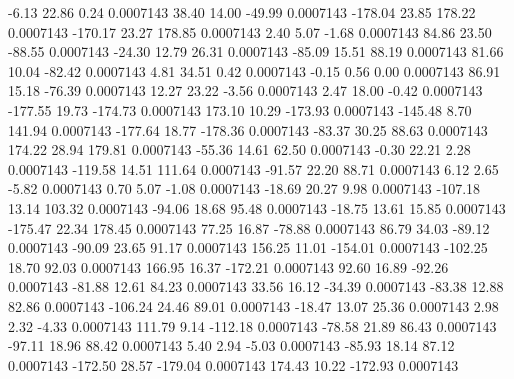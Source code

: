        -6.13       22.86        0.24     0.0007143
       38.40       14.00      -49.99     0.0007143
     -178.04       23.85      178.22     0.0007143
     -170.17       23.27      178.85     0.0007143
        2.40        5.07       -1.68     0.0007143
       84.86       23.50      -88.55     0.0007143
      -24.30       12.79       26.31     0.0007143
      -85.09       15.51       88.19     0.0007143
       81.66       10.04      -82.42     0.0007143
        4.81       34.51        0.42     0.0007143
       -0.15        0.56        0.00     0.0007143
       86.91       15.18      -76.39     0.0007143
       12.27       23.22       -3.56     0.0007143
        2.47       18.00       -0.42     0.0007143
     -177.55       19.73     -174.73     0.0007143
      173.10       10.29     -173.93     0.0007143
     -145.48        8.70      141.94     0.0007143
     -177.64       18.77     -178.36     0.0007143
      -83.37       30.25       88.63     0.0007143
      174.22       28.94      179.81     0.0007143
      -55.36       14.61       62.50     0.0007143
       -0.30       22.21        2.28     0.0007143
     -119.58       14.51      111.64     0.0007143
      -91.57       22.20       88.71     0.0007143
        6.12        2.65       -5.82     0.0007143
        0.70        5.07       -1.08     0.0007143
      -18.69       20.27        9.98     0.0007143
     -107.18       13.14      103.32     0.0007143
      -94.06       18.68       95.48     0.0007143
      -18.75       13.61       15.85     0.0007143
     -175.47       22.34      178.45     0.0007143
       77.25       16.87      -78.88     0.0007143
       86.79       34.03      -89.12     0.0007143
      -90.09       23.65       91.17     0.0007143
      156.25       11.01     -154.01     0.0007143
     -102.25       18.70       92.03     0.0007143
      166.95       16.37     -172.21     0.0007143
       92.60       16.89      -92.26     0.0007143
      -81.88       12.61       84.23     0.0007143
       33.56       16.12      -34.39     0.0007143
      -83.38       12.88       82.86     0.0007143
     -106.24       24.46       89.01     0.0007143
      -18.47       13.07       25.36     0.0007143
        2.98        2.32       -4.33     0.0007143
      111.79        9.14     -112.18     0.0007143
      -78.58       21.89       86.43     0.0007143
      -97.11       18.96       88.42     0.0007143
        5.40        2.94       -5.03     0.0007143
      -85.93       18.14       87.12     0.0007143
     -172.50       28.57     -179.04     0.0007143
      174.43       10.22     -172.93     0.0007143
